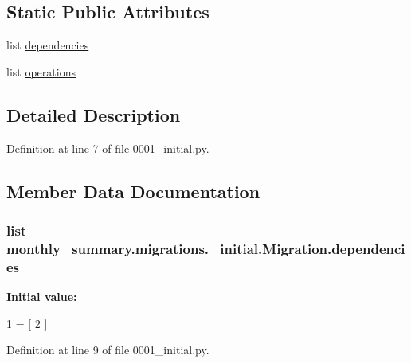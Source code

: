 \subsection*{Static Public Attributes}
\begin{DoxyCompactItemize}
\item 
list \hyperlink{classmonthly__summary_1_1migrations_1_10001__initial_1_1Migration_a6b6332fbafdb5ea2bf350abcb4efefd8}{dependencies}
\item 
list \hyperlink{classmonthly__summary_1_1migrations_1_10001__initial_1_1Migration_a00ae68eb78cb0d5e03b889b9a8398b15}{operations}
\end{DoxyCompactItemize}


\subsection{Detailed Description}


Definition at line 7 of file 0001\-\_\-initial.\-py.



\subsection{Member Data Documentation}
\hypertarget{classmonthly__summary_1_1migrations_1_10001__initial_1_1Migration_a6b6332fbafdb5ea2bf350abcb4efefd8}{
\subsubsection[{dependencies}]{\setlength{\rightskip}{0pt plus 5cm}list monthly\-\_\-summary.\-migrations.\-\_\-initial.\-Migration.\-dependencies\hspace{0.3cm}{\ttfamily [static]}}}\label{classmonthly__summary_1_1migrations_1_10001__initial_1_1Migration_a6b6332fbafdb5ea2bf350abcb4efefd8}
{\bfseries Initial value\-:}
\begin{DoxyCode}
1 = [
2     ]
\end{DoxyCode}


Definition at line 9 of file 0001\-\_\-initial.\-py.

